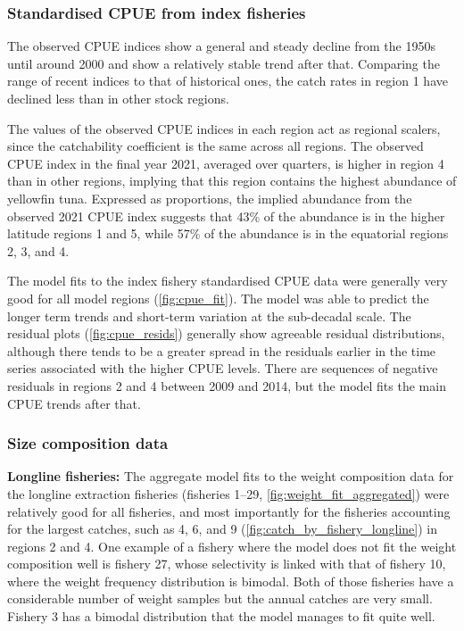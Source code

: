 \subsubsection{Standardised CPUE from index fisheries}
\label{sec:fit_cpue}

The observed CPUE indices show a general and steady decline from the 1950s until around 2000 and show a relatively stable trend after that. Comparing the range of recent indices to that of historical ones, the catch rates in region 1 have declined less than in other stock regions.

The values of the observed CPUE indices in each region act as regional scalers, since the catchability coefficient is the same across all regions. The observed CPUE index in the final year 2021, averaged over quarters, is higher in region 4 than in other regions, implying that this region contains the highest abundance of yellowfin tuna. Expressed as proportions, the implied abundance from the observed 2021 CPUE index suggests that 43\% of the abundance is in the higher latitude regions 1 and 5, while 57\% of the abundance is in the equatorial regions 2, 3, and 4.

The model fits to the index fishery standardised CPUE data were generally very good for all model regions (\autoref{fig:cpue_fit}). The model was able to predict the longer term trends and short-term variation at the sub-decadal scale. The residual plots (\autoref{fig:cpue_resids}) generally show agreeable residual distributions, although there tends to be a greater spread in the residuals earlier in the time series associated with the higher CPUE levels. There are sequences of negative residuals in regions 2 and 4 between 2009 and 2014, but the model fits the main CPUE trends after that.

\subsubsection{Size composition data}
\label{sec:fit_sizecomp}

\textbf{Longline fisheries:} The aggregate model fits to the weight composition data for the longline extraction fisheries (fisheries 1--29, \autoref{fig:weight_fit_aggregated}) were relatively good for all fisheries, and most importantly for the fisheries accounting for the largest catches, such as 4, 6, and 9 (\autoref{fig:catch_by_fishery_longline}) in regions 2 and 4. One example of a fishery where the model does not fit the weight composition well is fishery 27, whose selectivity is linked with that of fishery 10, where the weight frequency distribution is bimodal. Both of those fisheries have a considerable number of weight samples but the annual catches are very small. Fishery 3 has a bimodal distribution that the model manages to fit quite well.

